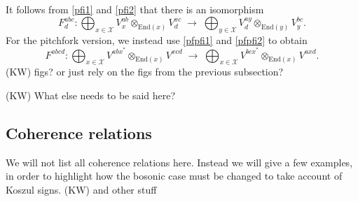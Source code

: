 \documentclass[12pt,a4paper]{article}
\newcommand{\tp}{\otimes}
\newcommand{\mcx}{\mathcal{X}}
\newcommand\be            {\begin{equation}}
\newcommand\ee            {\end{equation}}
\newcommand{\End}{\text{End}}
\newcommand{\kw}[1]{{\color{kwcolor}\footnotesize{(KW) #1}}}
\begin{document}
It follows from \ref{pfi1} and \ref{pfi2} that there is an isomorphism
\be  \label{fdef21}
	F^{abc}_d : \bigoplus_{x\in \mcx} V^{ab}_x \tp_{\End(x)} V^{xc}_d \;\to\; \bigoplus_{y\in \mcx} V^{ay}_d \tp_{\End(y)} V^{bc}_y .
\ee
For the pitchfork version, we instead use \ref{pfpfi1} and \ref{pfpfi2} to obtain
\be  \label{fdef30}
	F^{abcd} : \bigoplus_{x\in \mcx} V^{abx^*} \tp_{\End(x)} V^{xcd}   \;\to\;   \bigoplus_{x\in \mcx} V^{bcx^*} \tp_{\End(x)} V^{axd} .
\ee
\kw{figs?  or just rely on the figs from the previous subsection?}



\bigskip


\kw{What else needs to be said here?}




\subsection{Coherence relations} \label{coherence_ss}

We will not list all coherence relations here.
Instead we will give a few examples, in order to highlight how the bosonic case
must be changed to take account of Koszul signs.
\kw{and other stuff}

\medskip
\end{document}
